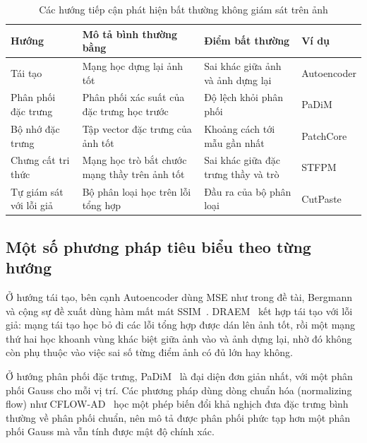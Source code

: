 \begin{table}[htbp]
  \centering
  \caption{Các hướng tiếp cận phát hiện bất thường không giám sát trên ảnh}
  \label{tab:approaches}
  \small
  \begin{tabular}{@{}>{\raggedright\arraybackslash}p{3.3cm} >{\raggedright\arraybackslash}p{4.6cm} >{\raggedright\arraybackslash}p{4.2cm} >{\raggedright\arraybackslash}p{2.4cm}@{}}
    \toprule
    Hướng & Mô tả bình thường bằng & Điểm bất thường & Ví dụ \\
    \midrule
    Tái tạo & Mạng học dựng lại ảnh tốt & Sai khác giữa ảnh và ảnh dựng lại & Autoencoder \\
    Phân phối đặc trưng & Phân phối xác suất của đặc trưng học trước & Độ lệch khỏi phân phối & PaDiM \\
    Bộ nhớ đặc trưng & Tập vector đặc trưng của ảnh tốt & Khoảng cách tới mẫu gần nhất & PatchCore \\
    Chưng cất tri thức & Mạng học trò bắt chước mạng thầy trên ảnh tốt & Sai khác giữa đặc trưng thầy và trò & STFPM \\
    Tự giám sát với lỗi giả & Bộ phân loại học trên lỗi tổng hợp & Đầu ra của bộ phân loại & CutPaste \\
    \bottomrule
  \end{tabular}
\end{table}

\subsection{Một số phương pháp tiêu biểu theo từng hướng}

Ở hướng tái tạo, bên cạnh Autoencoder dùng MSE như trong đề tài, Bergmann và cộng sự đề xuất dùng hàm mất mát
SSIM~\cite{bergmannImprovingUnsupervisedDefect2019}. DRAEM~\cite{zavrtanikDRAEMDiscriminativelyTrained2021} kết hợp
tái tạo với lỗi giả: mạng tái tạo học bỏ đi các lỗi tổng hợp được dán lên ảnh tốt, rồi một mạng thứ hai học khoanh
vùng khác biệt giữa ảnh vào và ảnh dựng lại, nhờ đó không còn phụ thuộc vào việc sai số từng điểm ảnh có đủ lớn hay
không.

Ở hướng phân phối đặc trưng, PaDiM~\cite{defardPaDiMPatchDistribution2021} là đại diện đơn giản nhất, với một phân
phối Gauss cho mỗi vị trí. Các phương pháp dùng dòng chuẩn hóa (normalizing flow) như
CFLOW-AD~\cite{gudovskiyCFLOWADRealTimeUnsupervised2022} học một phép biến đổi khả nghịch đưa đặc trưng bình thường về
phân phối chuẩn, nên mô tả được phân phối phức tạp hơn một phân phối Gauss mà vẫn tính được mật độ chính xác.

